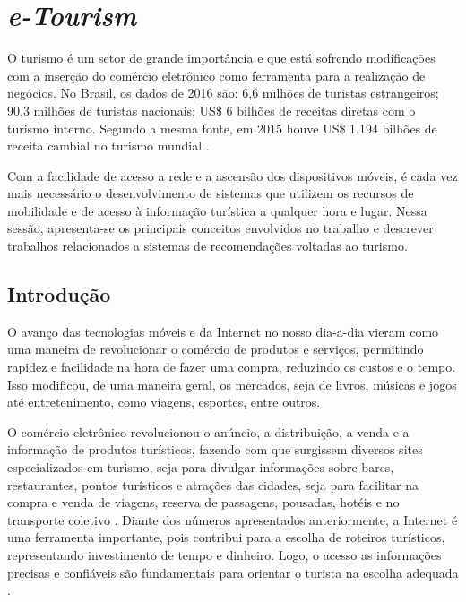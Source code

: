 \chapter{\textit{e-Tourism}}
\label{chp:eTourism}

O turismo é um setor de grande importância e que está sofrendo modificações com a inserção do comércio eletrônico como ferramenta para a realização de negócios. No Brasil, os dados de 2016 são: 6,6 milhões de turistas estrangeiros; 90,3 milhões de turistas nacionais; US\$ 6 bilhões de receitas diretas com o turismo interno. Segundo a mesma fonte, em 2015 houve US\$ 1.194 bilhões de receita cambial no turismo mundial \citep{embratur2016}.

Com a facilidade de acesso a rede e a ascensão dos dispositivos móveis, é cada vez mais necessário o desenvolvimento de sistemas que utilizem os recursos de mobilidade e de acesso à informação turística a qualquer hora e lugar. Nessa sessão, apresenta-se os principais conceitos envolvidos no trabalho e descrever trabalhos relacionados a sistemas de recomendações voltadas ao turismo.

\section{Introdução}
\label{sec:introductionETourism}

O avanço das tecnologias móveis e da Internet no nosso dia-a-dia vieram como uma maneira de revolucionar o comércio de produtos e serviços, permitindo rapidez e facilidade na hora de fazer uma compra, reduzindo os custos e o tempo. Isso modificou, de uma maneira geral, os mercados, seja de livros, músicas e jogos até entretenimento, como viagens, esportes, entre outros.

O comércio eletrônico revolucionou o anúncio, a distribuição, a venda e a informação de produtos turísticos, fazendo com que surgissem diversos sites especializados em turismo, seja para divulgar informações sobre bares, restaurantes, pontos turísticos e atrações das cidades, seja para facilitar na compra e venda de viagens, reserva de passagens, pousadas, hotéis e no transporte coletivo \citep{115416147001}. Diante dos números apresentados anteriormente, a Internet é uma ferramenta importante, pois contribui para a escolha de roteiros turísticos, representando investimento de tempo e dinheiro. Logo, o acesso as informações precisas e confiáveis são fundamentais para orientar o turista na escolha adequada \citep{115416147001}.

